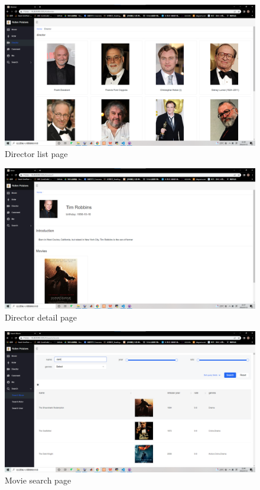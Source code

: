 \begin{CJK*}{UTF8}{gbsn}
    \begin{figure}[htbp]
    \centering
    \includegraphics[width=1\textwidth]{res_dir1.png}
    \caption{Director list page}
    \end{figure}
    
    \begin{figure}[htbp]
    \centering
    \includegraphics[width=1\textwidth]{res_actor2.png}
    \caption{Director detail page}
    \end{figure}
    
    \begin{figure}[htbp]
    \centering
    \includegraphics[width=1\textwidth]{res_search1.png}
    \caption{Movie search page}
    \end{figure}
    

\end{CJK*}
